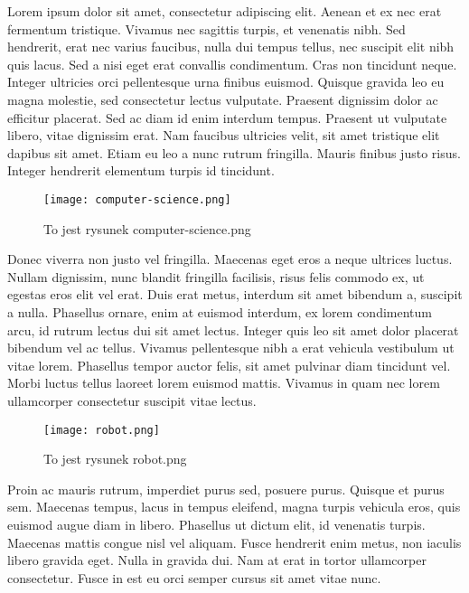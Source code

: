 \documentclass[12pt]{article}
\begin{document}
Lorem ipsum dolor sit amet, consectetur adipiscing elit. Aenean et ex nec erat fermentum tristique. Vivamus nec sagittis turpis, et venenatis nibh. Sed hendrerit, erat nec varius faucibus, nulla dui tempus tellus, nec suscipit elit nibh quis lacus. Sed a nisi eget erat convallis condimentum. Cras non tincidunt neque. Integer ultricies orci pellentesque urna finibus euismod. Quisque gravida leo eu magna molestie, sed consectetur lectus vulputate. Praesent dignissim dolor ac efficitur placerat. Sed ac diam id enim interdum tempus. Praesent ut vulputate libero, vitae dignissim erat. Nam faucibus ultricies velit, sit amet tristique elit dapibus sit amet. Etiam eu leo a nunc rutrum fringilla. Mauris finibus justo risus. Integer hendrerit elementum turpis id tincidunt.

\begin{figure}[h]
    \centering
    
    \texttt{[image: computer-science.png]}
    \caption{To jest rysunek computer-science.png}
    \label{fig:computer-science}
\end{figure}



Donec viverra non justo vel fringilla. Maecenas eget eros a neque ultrices luctus. Nullam dignissim, nunc blandit fringilla facilisis, risus felis commodo ex, ut egestas eros elit vel erat. Duis erat metus, interdum sit amet bibendum a, suscipit a nulla. Phasellus ornare, enim at euismod interdum, ex lorem condimentum arcu, id rutrum lectus dui sit amet lectus. Integer quis leo sit amet dolor placerat bibendum vel ac tellus. Vivamus pellentesque nibh a erat vehicula vestibulum ut vitae lorem. Phasellus tempor auctor felis, sit amet pulvinar diam tincidunt vel. Morbi luctus tellus laoreet lorem euismod mattis. Vivamus in quam nec lorem ullamcorper consectetur suscipit vitae lectus.

\begin{figure}[b]
    \centering
    
    \texttt{[image: robot.png]}
    \caption{To jest rysunek robot.png}
    \label{fig:robot}
\end{figure}

Proin ac mauris rutrum, imperdiet purus sed, posuere purus. Quisque et purus sem. Maecenas tempus, lacus in tempus eleifend, magna turpis vehicula eros, quis euismod augue diam in libero. Phasellus ut dictum elit, id venenatis turpis. Maecenas mattis congue nisl vel aliquam. Fusce hendrerit enim metus, non iaculis libero gravida eget. Nulla in gravida dui. Nam at erat in tortor ullamcorper consectetur. Fusce in est eu orci semper cursus sit amet vitae nunc.
\end{document}
